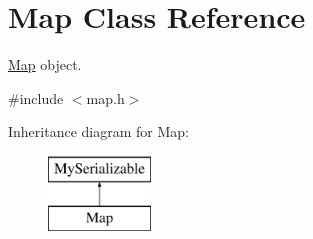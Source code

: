 \hypertarget{class_map}{}\section{Map Class Reference}
\label{class_map}


\hyperlink{class_map}{Map} object.  




{\ttfamily \#include $<$map.\+h$>$}

Inheritance diagram for Map\+:\begin{figure}[H]
\begin{center}
\leavevmode
\includegraphics[height=2.000000cm]{class_map}
\end{center}
\end{figure}
